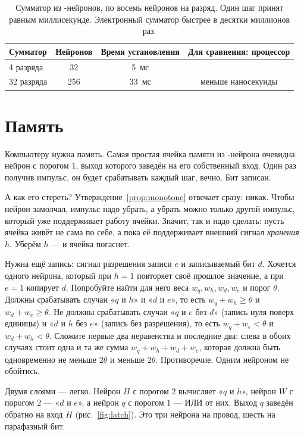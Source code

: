 \begin{table}[t]
\centering
\small
\begin{tabular}{lccc}
\toprule
Сумматор & Нейронов & Время установления & Для сравнения: процессор \\
\midrule
4 разряда & 32 & 5~мс & \\
32 разряда & 256 & 33~мс & меньше наносекунды \\
\bottomrule
\end{tabular}
\caption{Сумматор из -нейронов, по восемь нейронов на разряд. Один шаг принят равным миллисекунде. Электронный сумматор быстрее в десятки миллионов раз.}
\label{tab:adder}
\end{table}

\section{Память}

Компьютеру нужна память. Самая простая ячейка памяти из -нейрона очевидна: нейрон с порогом $1$, выход которого заведён на его собственный вход. Один раз получив импульс, он будет срабатывать каждый шаг, вечно. Бит записан.

А как его стереть? Утверждение~\ref{prop:monotone} отвечает сразу: никак. Чтобы нейрон замолчал, импульс надо убрать, а убрать можно только другой импульс, который уже поддерживает работу ячейки. Значит, так и надо сделать: пусть ячейка живёт не сама по себе, а пока её поддерживает внешний сигнал \emph{хранения} $h$. Уберём $h$ --- и ячейка погаснет.

Нужна ещё запись: сигнал разрешения записи $e$ и записываемый бит $d$. Хочется одного нейрона, который при $h=1$ повторяет своё прошлое значение, а при $e=1$ копирует $d$. Попробуйте найти для него веса $w_q,w_h,w_d,w_e$ и порог $\theta$. Должны срабатывать случаи «$q$ и $h$» и «$d$ и $e$», то есть $w_q+w_h\ge\theta$ и $w_d+w_e\ge\theta$. Не должны срабатывать случаи «$q$ и $e$ без $d$» (запись нуля поверх единицы) и «$d$ и $h$ без $e$» (запись без разрешения), то есть $w_q+w_e<\theta$ и $w_d+w_h<\theta$. Сложите первые два неравенства и последние два: слева в обоих случаях стоит одна и та же сумма $w_q+w_h+w_d+w_e$, которая должна быть одновременно не меньше $2\theta$ и меньше $2\theta$. Противоречие. Одним нейроном не обойтись.

Двумя слоями --- легко. Нейрон $H$ с порогом $2$ вычисляет «$q$ и $h$», нейрон $W$ с порогом $2$ --- «$d$ и $e$», а нейрон $q$ с порогом $1$ --- ИЛИ от них. Выход $q$ заведён обратно на вход $H$ (рис.~\ref{fig:latch}). Это три нейрона на провод, шесть на парафазный бит.

